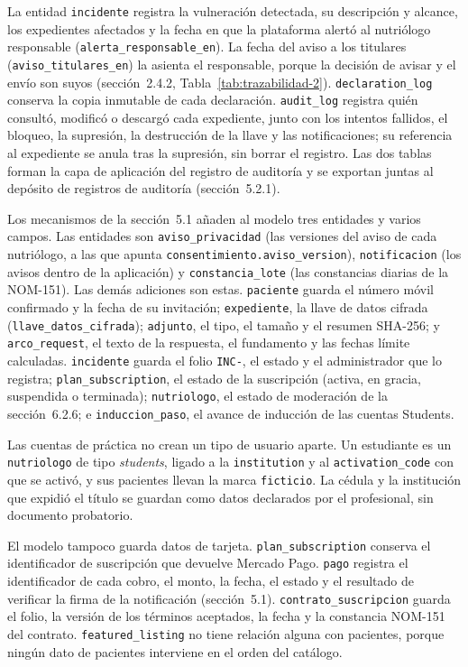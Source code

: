 \documentclass[12pt, a4paper]{article}
\begin{document}
La entidad \texttt{incidente} registra la vulneración detectada, su
descripción y alcance, los expedientes afectados y la fecha en que la
plataforma alertó al nutriólogo responsable
(\texttt{alerta\_responsable\_en}). La fecha del aviso a los titulares
(\texttt{aviso\_titulares\_en}) la asienta el responsable, porque la
decisión de avisar y el envío son suyos (sección~2.4.2,
Tabla~\ref{tab:trazabilidad-2}). \texttt{declaration\_log} conserva la
copia inmutable de cada declaración. \texttt{audit\_log} registra quién
consultó, modificó o descargó cada expediente, junto con los intentos
fallidos, el bloqueo, la supresión, la destrucción de la llave y las
notificaciones; su referencia al expediente se anula tras la supresión,
sin borrar el registro. Las dos tablas forman la capa de aplicación del
registro de auditoría y se exportan juntas al depósito de registros de
auditoría (sección~5.2.1).

Los mecanismos de la sección~5.1 añaden al modelo tres entidades y
varios campos. Las entidades son \texttt{aviso\_privacidad} (las
versiones del aviso de cada nutriólogo, a las que apunta
\texttt{consentimiento.aviso\_version}), \texttt{notificacion} (los
avisos dentro de la aplicación) y \texttt{constancia\_lote} (las
constancias diarias de la NOM-151). Las demás adiciones son estas.
\texttt{paciente} guarda el número móvil confirmado y la fecha de su
invitación; \texttt{expediente}, la llave de datos cifrada
(\texttt{llave\_datos\_cifrada}); \texttt{adjunto}, el tipo, el tamaño y
el resumen SHA-256; y \texttt{arco\_request}, el texto de la respuesta,
el fundamento y las fechas límite calculadas. \texttt{incidente} guarda
el folio \texttt{INC-}, el estado y el administrador que lo registra;
\texttt{plan\_subscription}, el estado de la suscripción (activa, en
gracia, suspendida o terminada); \texttt{nutriologo}, el estado de
moderación de la sección~6.2.6; e \texttt{induccion\_paso}, el avance de
inducción de las cuentas Students.
 
Las cuentas de práctica no crean un tipo de usuario aparte. Un
estudiante es un \texttt{nutriologo} de tipo \textit{students}, ligado a
la \texttt{institution} y al \texttt{activation\_code} con que se
activó, y sus pacientes llevan la marca \texttt{ficticio}. La cédula y
la institución que expidió el título se guardan como datos declarados
por el profesional, sin documento probatorio.

El modelo tampoco guarda datos de tarjeta. \texttt{plan\_subscription}
conserva el identificador de suscripción que devuelve Mercado Pago.
\texttt{pago} registra el identificador de cada cobro, el monto, la
fecha, el estado y el resultado de verificar la firma de la notificación
(sección~5.1). \texttt{contrato\_suscripcion} guarda el folio, la
versión de los términos aceptados, la fecha y la constancia NOM-151 del
contrato. \texttt{featured\_listing} no tiene relación alguna con
pacientes, porque ningún dato de pacientes interviene en el orden del
catálogo.
 
\end{document}
